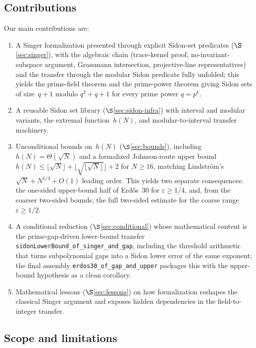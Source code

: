 \documentclass[11pt,a4paper]{article}
\begin{document}
\subsection{Contributions}

Our main contributions are:
\begin{enumerate}[nosep]
  \item A Singer formalization presented through explicit
    Sidon-set predicates ($\S$\ref{sec:singer}), with the algebraic chain
    (trace-kernel proof, no-invariant-subspace argument, Grassmann
    intersection, projective-line representatives) and the transfer through
    the modular Sidon predicate fully unfolded; this yields the prime-field
    theorem and the prime-power theorem giving Sidon sets of size~$q+1$ modulo
    \(q^2+q+1\) for every prime power \(q=p^k\).
  \item A reusable Sidon set library ($\S$\ref{sec:sidon-infra}) with interval
    and modular variants, the extremal function~$h(N)$, and modular-to-interval
    transfer machinery.
  \item Unconditional bounds on~$h(N)$ ($\S$\ref{sec:bounds}), including
    $h(N) = \Theta(\sqrt{N})$ and a formalized Johnson-route upper bound
    $h(N) \le \lfloor\sqrt{N}\rfloor+\lfloor\sqrt{\lfloor\sqrt{N}\rfloor}\rfloor+2$ for $N\ge16$,
    matching Lindstr\"om's $\sqrt N + N^{1/4}+O(1)$ leading order.
    This yields two separate consequences: the one-sided upper-bound half of
    Erd\H{o}s~30 for $\varepsilon\ge1/4$, and, from the coarser two-sided
    bounds, the full two-sided estimate for the coarse range
    $\varepsilon \ge 1/2$.
  \item A conditional reduction ($\S$\ref{sec:conditional}) whose mathematical
    content is the prime-gap-driven lower-bound transfer
    \texttt{sidonLowerBound\_\allowbreak{}of\_\allowbreak{}singer\_\allowbreak{}and\_\allowbreak{}gap},
    including the threshold arithmetic that turns subpolynomial gaps into a
    Sidon lower error of the same exponent; the final assembly
    \texttt{erdos30\_\allowbreak{}of\_\allowbreak{}gap\_\allowbreak{}and\_\allowbreak{}upper}
    packages this with the upper-bound hypothesis as a clean corollary.
  \item Mathematical lessons ($\S$\ref{sec:lessons}) on how formalization
    reshapes the classical Singer argument and exposes hidden dependencies in
    the field-to-integer transfer.
\end{enumerate}

\subsection{Scope and limitations}
\end{document}
